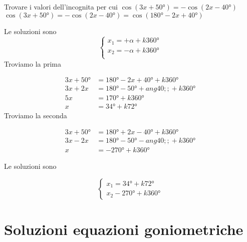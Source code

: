 \begin{exercise}
	Trovare i valori dell'incognita per cui $\cos(3x+\ang{50;;} )=-\cos(2x -\ang{40;;})$
	\tcblower
$\cos(3x+\ang{50;;} )=-\cos(2x -\ang{40;;})=\cos(\ang{180;;}-2x+\ang{40;;})$
	
	Le soluzioni sono 
	\[\begin{cases}
	x_1=+\alpha+k\ang{360;;}\\
	x_2=-\alpha+k\ang{360;;}\\
	\end{cases}\]
	Troviamo la prima
	
	\begin{align*}
	3x+\ang{50;;}&=\ang{180;;}-2x+\ang{40;;}+k\ang{360;;}\\
	3x+2x&=\ang{180;;}-\ang{50;;}+ang{40;;}+k\ang{360;;}\\
	5x&=\ang{170;;}+k\ang{360;;}\\
	x&=\ang{34;;}+k\ang{72;;}
	\end{align*}
	Troviamo la seconda
	
	\begin{align*}
		3x+\ang{50;;}&=\ang{180;;}+2x-\ang{40;;}+k\ang{360;;}\\
		3x-2x&=\ang{180;;}-\ang{50;;}-ang{40;;}+k\ang{360;;}\\
		x&=-\ang{270;;}+k\ang{360;;}
	\end{align*}
	
	Le soluzioni sono
	
	\[\begin{cases}
	x_1=\ang{34;;}+k\ang{72;;}\\
	x_2-\ang{270;;}+k\ang{360;;}
	\end{cases}\]
\end{exercise}
  \tcbstoprecording
  \newpage
 \section{Soluzioni equazioni goniometriche}
  \tcbinputrecords